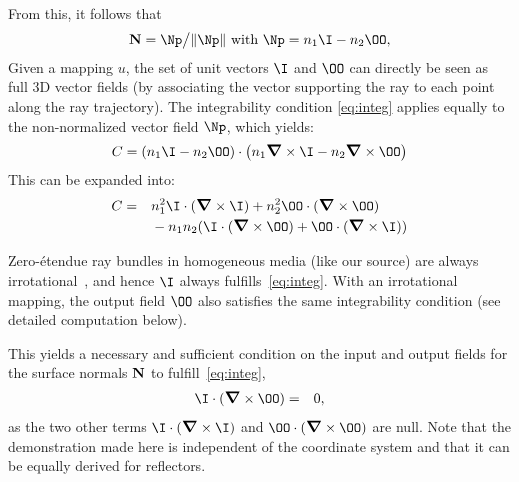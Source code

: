 From this, it follows that 
\[ \N=\Np\big/ \|\Np \|\text{~with~}\Np = n_1 \I - n_2 \OO,\]
Given a mapping $u$, the set of unit vectors $\I$ and $\OO$  can 
directly be seen as full 3D vector fields (by associating the vector supporting 
the ray to each point along the ray trajectory).
The integrability condition \eqref{eq:integ} applies equally to the non-normalized
vector field $\Np$, which yields:
\[ C = \left( n_1 \I - n_2 \OO \right) \cdot
       \left( n_1 \curl{\I} - n_2 \curl{\OO} \right) \]
This can be expanded into:
\begin{align*}
 C =\quad & n_1^ 2 \I\cdot(\curl{\I}) + n_2^2 \OO\cdot (\curl{\OO}) \nonumber \\
 & - n_1 n_2 ( \I \cdot (\curl{\OO}) + \OO\cdot (\curl{\I}))
\end{align*}

Zero-\'{e}tendue ray bundles in homogeneous media (like our source) 
are always irrotational~\cite{Minano2004z}, and hence $\I$ always 
fulfills~\eqref{eq:integ}. 
With an irrotational mapping,
the output field $\OO$ also satisfies the same integrability
condition (see detailed computation below).

This yields a necessary and sufficient condition 
on the input and
output fields for the surface normals $\mathbf{N}$ to fulfill~\eqref{eq:integ},
\begin{eqnarray}
\I\cdot(\curl{\OO}) & = & 0, 
\label{eq:integIO}
\end{eqnarray}
as the two other terms $\I\cdot(\curl{\I})$ and $\OO\cdot(\curl{\OO})$ 
are null.
Note that the demonstration made here is independent of the coordinate
system and that it can be equally derived for reflectors.

